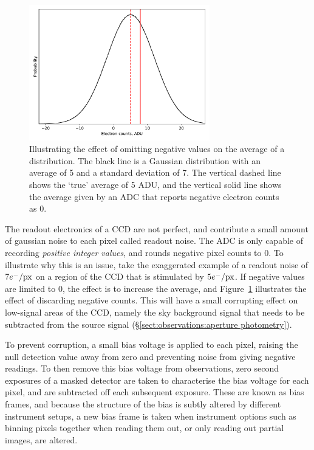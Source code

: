 \begin{figure}
    \centering
    \includegraphics[width=0.7\textwidth]{figures/observations/bias_frame_histogram.pdf}
    \caption{Illustrating the effect of omitting negative values on the average of a distribution. The black line is a Gaussian distribution with an average of 5 and a standard deviation of 7. The vertical dashed line shows the `true' average of 5 ADU, and the vertical solid line shows the average given by an ADC that reports negative electron counts as 0.}
    \label{fig:observations:bias frame histogram}
\end{figure}
The readout electronics of a CCD are not perfect, and contribute a small amount of gaussian noise to each pixel called readout noise. The ADC is only capable of recording {\it positive integer values}, and rounds negative pixel counts to 0. To illustrate why this is an issue, take the exaggerated example of a readout noise of $7 e^-/{\rm px}$ on a region of the CCD that is stimulated by $5 e^-/{\rm px}$. If negative values are limited to 0, the effect is to increase the average, and Figure~\ref{fig:observations:bias frame histogram} illustrates the effect of discarding negative counts.
This will have a small corrupting effect on low-signal areas of the CCD, namely the sky background signal that needs to be subtracted from the source signal (\S\ref{sect:observations:aperture photometry}).

To prevent corruption, a small bias voltage is applied to each pixel, raising the null detection value away from zero and preventing noise from giving negative readings. 
To then remove this bias voltage from observations, zero second exposures of a masked detector are taken to characterise the bias voltage for each pixel, and are subtracted off each subsequent exposure. These are known as bias frames, and because the structure of the bias is subtly altered by different instrument setups, a new bias frame is taken when instrument options such as binning pixels together when reading them out, or only reading out partial images, are altered. 


